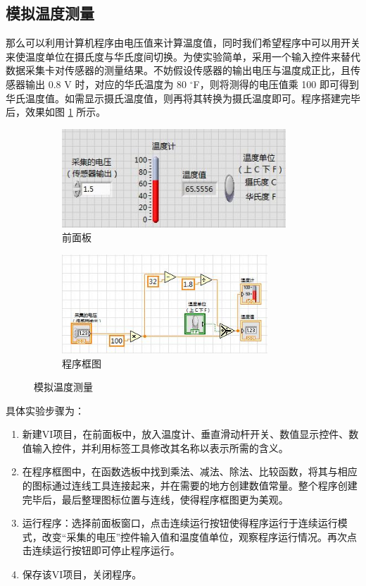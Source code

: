 \documentclass[UTF8]{article}
\theoremstyle{MyLineTheoremStyle} %
\theoremstyle{MyBlockTheoremStyle} %
\theoremstyle{MySubsubsectionStyle} %
\begin{document}
\subsection{模拟温度测量}
那么可以利用计算机程序由电压值来计算温度值，同时我们希望程序中可以用开关来使温度单位在摄氏度与华氏度间切换。为使实验简单，采用一个输入控件来替代数据采集卡对传感器的测量结果。不妨假设传感器的输出电压与温度成正比，且传感器输出 0.8 V 时，对应的华氏温度为 80 $^\circ$F，则将测得的电压值乘 100 即可得到华氏温度值。如需显示摄氏温度值，则再将其转换为摄氏温度即可。程序搭建完毕后，效果如图 \ref{模拟温度测量} 所示。
\begin{figure}[H]\centering
\begin{subfigure}[t]{0.52\columnwidth}\centering
    \includegraphics[height=105pt]{assets/模拟温度测量 面板_2.JPG}
    \caption{ 前面板 }
\end{subfigure}\hfill
\begin{subfigure}[t]{0.48\columnwidth}\centering
    \includegraphics[height=105pt]{assets/模拟温度测量 框图.JPG}
    \caption{ 程序框图 }
\end{subfigure}
\caption{ 模拟温度测量 }
\label{模拟温度测量}
\end{figure}

\noindent 具体实验步骤为：
\begin{enumerate}
\item 新建VI项目，在前面板中，放入温度计、垂直滑动杆开关、数值显示控件、数值输入控件，并利用标签工具修改其名称以表示所需的含义。
\item 在程序框图中，在函数选板中找到乘法、减法、除法、比较函数，将其与相应的图标通过连线工具连接起来，并在需要的地方创建数值常量。整个程序创建完毕后，最后整理图标位置与连线，使得程序框图更为美观。
\item 运行程序：选择前面板窗口，点击连续运行按钮使得程序运行于连续运行模式，改变“采集的电压”控件输入值和温度值单位，观察程序运行情况。再次点击连续运行按钮即可停止程序运行。
\item 保存该VI项目，关闭程序。
\end{enumerate}
\end{document}
